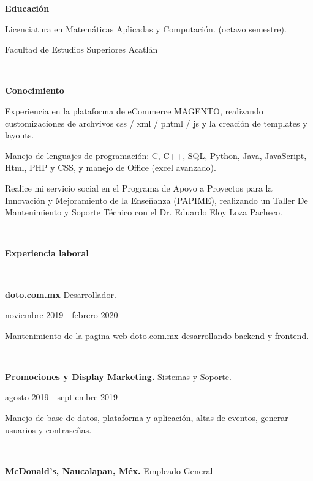 \documentclass[10pt]{article}
\begin{document}
\begin{large}
\textbf{Educaci\'on}
\end{large}


Licenciatura en Matem\'aticas Aplicadas y Computaci\'on.  (octavo semestre).

Facultad de Estudios Superiores Acatl\'an

\ 




\begin{large}
\textbf{Conocimiento}
\end{large}

Experiencia en la plataforma de eCommerce MAGENTO, realizando customizaciones de archvivos  css / xml / phtml / js y la creación de templates y layouts.


Manejo de lenguajes de programaci\'on: C, C++,  SQL, Python, Java, JavaScript, Html, PHP y CSS, y manejo de Office (excel avanzado). 


Realice mi servicio social en el Programa de Apoyo a Proyectos para la Innovaci\'on y Mejoramiento de la Ense\~nanza (PAPIME), realizando un Taller De Mantenimiento y Soporte T\'ecnico %
con el Dr. Eduardo Eloy Loza Pacheco.


\ 

\begin{large}
\textbf{Experiencia laboral}
\end{large}

\ 

\textbf{doto.com.mx}  Desarrollador.

noviembre 2019 - febrero 2020

Mantenimiento de la pagina web doto.com.mx desarrollando backend y frontend.

\ 

\textbf{Promociones y Display Marketing.} Sistemas y Soporte.

agosto 2019 - septiembre 2019

Manejo de base de datos, plataforma y aplicación, altas de eventos, generar usuarios y contraseñas.

\ 

\textbf{McDonald's, Naucalapan, M\'ex.}
Empleado General
 
\end{document}
